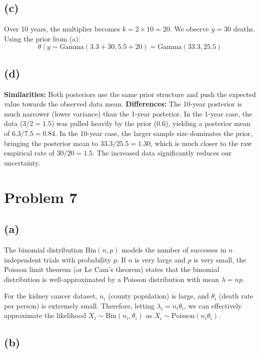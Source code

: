 \documentclass[
  letterpaper,
  DIV=11,
  numbers=noendperiod]{scrartcl}
\begin{document}
\subsection{(c)}\label{c-2}

Over 10 years, the multiplier becomes \(k = 2 \times 10 = 20\). We
observe \(y = 30\) deaths. Using the prior from (a): \[
\theta \mid y \sim \text{Gamma}(3.3 + 30, 5.5 + 20) = \text{Gamma}(33.3, 25.5)
\]

\subsection{(d)}\label{d-1}

\textbf{Similarities:} Both posteriors use the same prior structure and
push the expected value towards the observed data mean.
\textbf{Differences:} The 10-year posterior is much narrower (lower
variance) than the 1-year posterior. In the 1-year case, the data
(\(3/2 = 1.5\)) was pulled heavily by the prior (\(0.6\)), yielding a
posterior mean of \(6.3 / 7.5 = 0.84\). In the 10-year case, the larger
sample size dominates the prior, bringing the posterior mean to
\(33.3 / 25.5 = 1.30\), which is much closer to the raw empirical rate
of \(30/20 = 1.5\). The increased data significantly reduces our
uncertainty.

\section{Problem 7}\label{problem-7}

\subsection{(a)}\label{a-5}

The binomial distribution \(\text{Bin}(n, p)\) models the number of
successes in \(n\) independent trials with probability \(p\). If \(n\)
is very large and \(p\) is very small, the Poisson limit theorem (or Le
Cam's theorem) states that the binomial distribution is
well-approximated by a Poisson distribution with mean \(\lambda = np\).

For the kidney cancer dataset, \(n_i\) (county population) is large, and
\(\theta_i\) (death rate per person) is extremely small. Therefore,
letting \(\lambda_i = n_i \theta_i\), we can effectively approximate the
likelihood \(X_i \sim \text{Bin}(n_i, \theta_i)\) as
\(X_i \sim \text{Poisson}(n_i \theta_i)\).

\subsection{(b)}\label{b-5}
\end{document}
